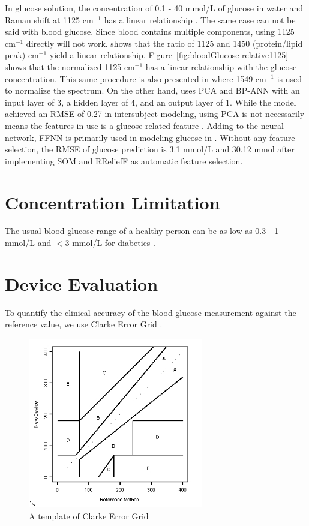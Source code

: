 In glucose solution, the concentration of 0.1 - 40 mmol/L of glucose in water and Raman shift at 1125 $\text{cm}^{-1}$ has a linear relationship \cite{solutionGlucose}.
The same case can not be said with blood glucose.
Since blood contains multiple components, using 1125 $\text{cm}^{-1}$ directly will not work. 
\cite{directGlucose} shows that the ratio of 1125 and 1450 (protein/lipid peak) $\text{cm}^{-1}$ yield a linear relationship.
Figure~\ref{fig:bloodGlucose-relative1125} shows that the normalized 1125 $\text{cm}^{-1}$ has a linear relationship with the glucose concentration.
This same procedure is also presented in \citep{solutionGlucose} where 1549 $\text{cm}^{-1}$ is used to normalize the spectrum.
On the other hand, \cite{ramanNailFold2019} uses PCA and BP-ANN with an input layer of 3, a hidden layer of 4, and an output layer of 1. 
While the model achieved an RMSE of 0.27 in intersubject modeling, using PCA is not necessarily means the features in use is a glucose-related feature \citep{directGlucose}.
Adding to the neural network, FFNN is primarily used in modeling glucose in \citep{sitecompare}. 
Without any feature selection, the RMSE of glucose prediction is 3.1 mmol/L and 30.12 mmol after implementing SOM and RReliefF as automatic feature selection.


\section{Concentration Limitation}

The usual blood glucose range of a healthy person can be as low as 0.3 - 1 mmol/L and $<$3 mmol/L for diabeties \citep{solutionGlucose}.



\section{Device Evaluation}

To quantify the clinical accuracy of the blood glucose measurement against the reference value, we use Clarke Error Grid \citep{clarke}.

\begin{figure}
    \caption{A template of Clarke Error Grid}
    \centerline{\includegraphics[width=3in]{figures/Clarkeerrorgrid.jpeg}}
    \label{fig:clarkeerrorgrid}
\end{figure}

